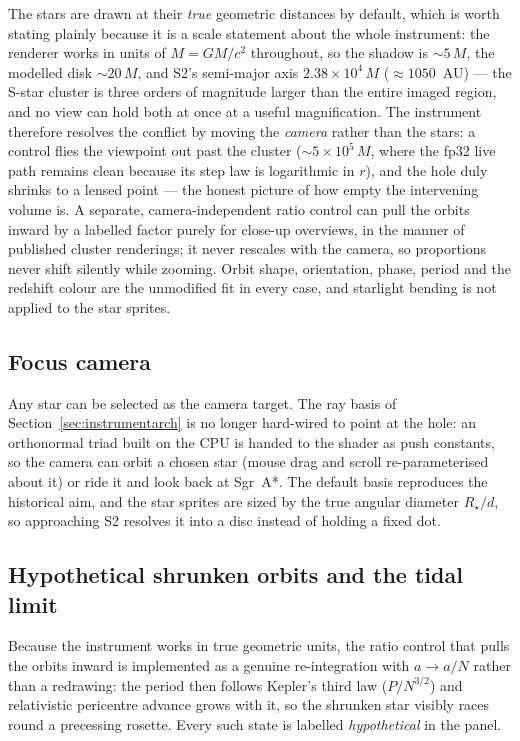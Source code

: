 The stars are drawn at their \emph{true} geometric distances by
default, which is worth stating plainly because it is a scale
statement about the whole instrument: the renderer works in units of
$M = GM/c^2$ throughout, so the shadow is $\sim\!5\,M$, the modelled
disk $\sim\!20\,M$, and S2's semi-major axis $2.38\times10^{4}\,M$
($\approx\!1050$~AU) — the S-star cluster is three orders of
magnitude larger than the entire imaged region, and no view can hold
both at once at a useful magnification. The instrument therefore
resolves the conflict by moving the \emph{camera} rather than the
stars: a control flies the viewpoint out past the cluster
($\sim\!5\times10^{5}\,M$, where the fp32 live path remains clean
because its step law is logarithmic in $r$), and the hole duly
shrinks to a lensed point — the honest picture of how empty the
intervening volume is. A separate, camera-independent ratio control
can pull the orbits inward by a labelled factor purely for close-up
overviews, in the manner of published cluster renderings; it never
rescales with the camera, so proportions never shift silently while
zooming. Orbit shape, orientation, phase, period and the redshift
colour are the unmodified fit in every case, and starlight bending is
not applied to the star sprites.

\subsection*{Focus camera}

Any star can be selected as the camera target. The ray basis of
Section~\ref{sec:instrumentarch} is no longer hard-wired to point at
the hole: an orthonormal triad built on the CPU is handed to the shader
as push constants, so the camera can orbit a chosen star (mouse drag
and scroll re-parameterised about it) or ride it and look back at
Sgr~A*. The default basis reproduces the historical aim, and the star
sprites are sized by the true angular diameter $R_\star/d$, so
approaching S2 resolves it into a disc instead of holding a fixed dot.

\subsection*{Hypothetical shrunken orbits and the tidal limit}
\label{sec:tidaldemo}

Because the instrument works in true geometric units, the ratio control
that pulls the orbits inward is implemented as a genuine re-integration
with $a \to a/N$ rather than a redrawing: the period then follows
Kepler's third law ($P/N^{3/2}$) and relativistic pericentre advance
grows with it, so the shrunken star visibly races round a precessing
rosette. Every such state is labelled \emph{hypothetical} in the panel.

